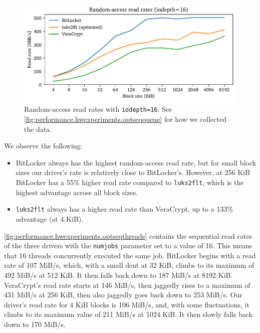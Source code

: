 \begin{figure}[htb!]
	\center
	\includegraphics[scale=1]{../fig/performance.hwexperiments.optrandqueue.pdf}
	\caption[
		Random-access read rates with \texttt{iodepth=16}
	]{
		Random-access read rates with \texttt{iodepth=16}. See \autoref{fig:performance.hwexperiments.optseqqueue} for how we collected the data.
	}
	\label{fig:performance.hwexperiments.optrandqueue}
\end{figure}

We observe the following:
\begin{itemize}[beginpenalty=10000]
	\item BitLocker always has the highest random-access read rate, but for small block sizes our driver's rate is relatively close to BitLocker's. However, at 256 KiB BitLocker has a 55\% higher read rate compared to \texttt{luks2flt}, which is the highest advantage across all block sizes.
	\item \texttt{luks2flt} always has a higher read rate than VeraCrypt, up to a 133\% advantage (at 4 KiB).
\end{itemize}

\autoref{fig:performance.hwexperiments.optseqthreads} contains the sequential read rates of the three drivers with the \texttt{numjobs} parameter set to a value of 16. This means that 16 threads concurrently executed the same job. BitLocker begins with a read rate of 107 MiB/s, which, with a small dent at 32 KiB, climbs to its maximum of 492 MiB/s at 512 KiB. It then falls back down to 187 MiB/s at 8192 KiB. VeraCrypt's read rate starts at 146 MiB/s, then jaggedly rises to a maximum of 431 MiB/s at 256 KiB, then also jaggedly goes back down to 253 MiB/s. Our driver's read rate for 4 KiB blocks is 106 MiB/s, and, with some fluctuations, it climbs to its maximum value of 211 MiB/s at 1024 KiB. It then slowly falls back down to 170 MiB/s.

